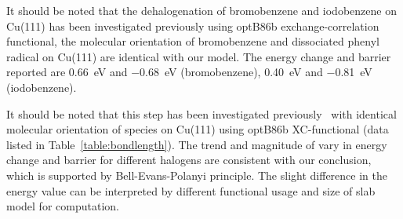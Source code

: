 \documentclass[%
 reprint,
 amsmath,amssymb,
 aps,
prb,
floatfix,
]{revtex4-2}
\newcommand{\lock}{\color{red}}
\newcommand{\lock}{\color{red}}
\newcommand{\comm}{\color{Purple}} %
\begin{document}
{{\lock
It should be noted that the dehalogenation of bromobenzene and iodobenzene on Cu(111) has been investigated previously\cite{jacs2013} using optB86b exchange-correlation
functional, the molecular orientation of bromobenzene and dissociated phenyl radical on Cu(111) are identical with our model. The energy change and barrier reported are \SI{0.66}{\electronvolt} and \SI{-0.68}{\electronvolt} (bromobenzene), \SI{0.40}{\electronvolt} and \SI{-0.81}{\electronvolt} (iodobenzene).
}

It should be noted that this step has been investigated previously~\cite{jacs2013} with identical molecular orientation of species on Cu(111) using optB86b XC-functional (data listed in Table~\ref{table:bondlength}). The trend and magnitude of vary in energy change and barrier for different halogens are consistent with our conclusion, which is supported by Bell-Evans-Polanyi principle. The slight difference in the energy value can be interpreted by different functional usage and size of slab model for computation.









}
\end{document}
